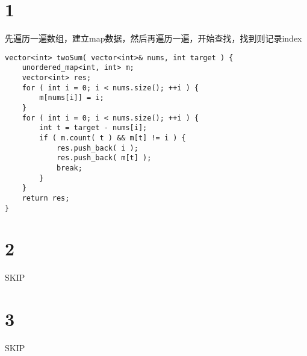 \documentclass[12pt,a4paper]{article}
\begin{document}
\section{1}
\begin{CJK}{UTF8}{gbsn}
先遍历一遍数组，建立map数据，然后再遍历一遍，开始查找，找到则记录index
\end{CJK}
\begin{lstlisting}
vector<int> twoSum( vector<int>& nums, int target ) {
	unordered_map<int, int> m;
	vector<int> res;
	for ( int i = 0; i < nums.size(); ++i ) {
		m[nums[i]] = i;
	}
	for ( int i = 0; i < nums.size(); ++i ) {
		int t = target - nums[i];
		if ( m.count( t ) && m[t] != i ) {
			res.push_back( i );
			res.push_back( m[t] );
			break;
		}
	}
	return res;
}
\end{lstlisting}

\section{2}
SKIP

\section{3}
SKIP
\end{document}

